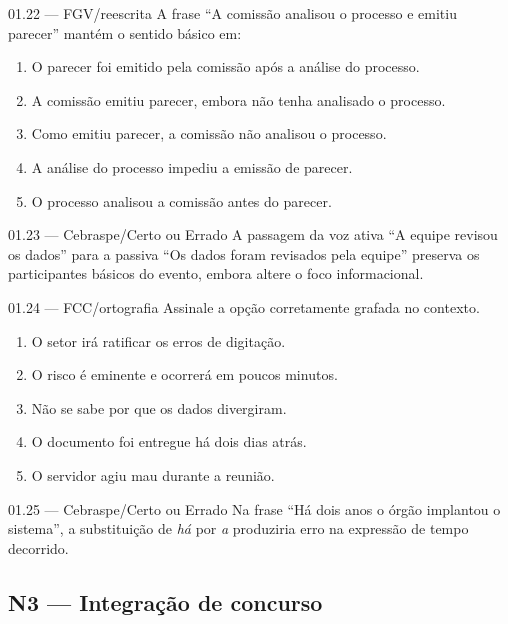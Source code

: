 \begin{questao}{ 01.22 — FGV/reescrita}
A frase ``A comissão analisou o processo e emitiu parecer'' mantém o sentido básico em:
\begin{enumerate}[label=\Alph*)]
\item O parecer foi emitido pela comissão após a análise do processo.
\item A comissão emitiu parecer, embora não tenha analisado o processo.
\item Como emitiu parecer, a comissão não analisou o processo.
\item A análise do processo impediu a emissão de parecer.
\item O processo analisou a comissão antes do parecer.
\end{enumerate}
\end{questao}

\begin{questao}{ 01.23 — Cebraspe/Certo ou Errado}
A passagem da voz ativa ``A equipe revisou os dados'' para a passiva ``Os dados foram revisados pela equipe'' preserva os participantes básicos do evento, embora altere o foco informacional.
\end{questao}

\begin{questao}{ 01.24 — FCC/ortografia}
Assinale a opção corretamente grafada no contexto.
\begin{enumerate}[label=\Alph*)]
\item O setor irá ratificar os erros de digitação.
\item O risco é eminente e ocorrerá em poucos minutos.
\item Não se sabe por que os dados divergiram.
\item O documento foi entregue há dois dias atrás.
\item O servidor agiu mau durante a reunião.
\end{enumerate}
\end{questao}

\begin{questao}{ 01.25 — Cebraspe/Certo ou Errado}
Na frase ``Há dois anos o órgão implantou o sistema'', a substituição de \emph{há} por \emph{a} produziria erro na expressão de tempo decorrido.
\end{questao}

\subsection*{N3 — Integração de concurso}

